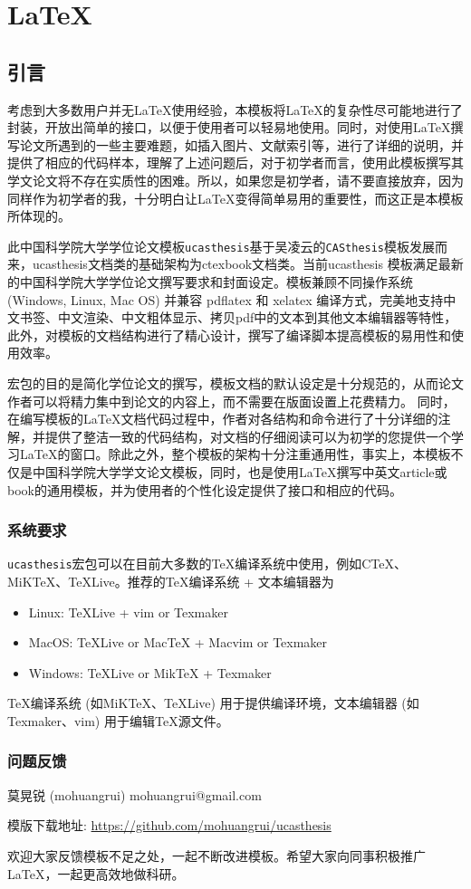 \part{\LaTeX{}} 

\chapter{引言}\label{chap:introduction}

考虑到大多数用户并无\LaTeX{}使用经验，本模板将\LaTeX{}的复杂性尽可能地进行了封装，开放出简单的接口，以便于使用者可以轻易地使用。同时，对使用\LaTeX{}撰写论文所遇到的一些主要难题，如插入图片、文献索引等，进行了详细的说明，并提供了相应的代码样本，理解了上述问题后，对于初学者而言，使用此模板撰写其学文论文将不存在实质性的困难。所以，如果您是初学者，请不要直接放弃，因为同样作为初学者的我，十分明白让\LaTeX{}变得简单易用的重要性，而这正是本模板所体现的。

此中国科学院大学学位论文模板\texttt{ucasthesis}基于吴凌云的\texttt{CASthesis}模板发展而来，ucasthesis文档类的基础架构为ctexbook文档类。当前ucasthesis 模板满足最新的中国科学院大学学位论文撰写要求和封面设定。模板兼顾不同操作系统 (Windows, Linux, Mac OS) 并兼容 pdflatex 和 xelatex 编译方式，完美地支持中文书签、中文渲染、中文粗体显示、拷贝pdf中的文本到其他文本编辑器等特性，此外，对模板的文档结构进行了精心设计，撰写了编译脚本提高模板的易用性和使用效率。

宏包的目的是简化学位论文的撰写，模板文档的默认设定是十分规范的，从而论文作者可以将精力集中到论文的内容上，而不需要在版面设置上花费精力。 同时，在编写模板的\LaTeX{}文档代码过程中，作者对各结构和命令进行了十分详细的注解，并提供了整洁一致的代码结构，对文档的仔细阅读可以为初学的您提供一个学习\LaTeX{}的窗口。除此之外，整个模板的架构十分注重通用性，事实上，本模板不仅是中国科学院大学学文论文模板，同时，也是使用\LaTeX{}撰写中英文article或book的通用模板，并为使用者的个性化设定提供了接口和相应的代码。

\section{系统要求}

\texttt{ucasthesis}宏包可以在目前大多数的\TeX{}编译系统中使用，例如C\TeX{}、MiK\TeX{}、\TeX{}Live。推荐的\TeX{}编译系统 + 文本编辑器为
\begin{itemize}
    \item Linux: \TeX{}Live + vim or Texmaker
    \item MacOS: \TeX{}Live or Mac\TeX{} + Macvim or Texmaker
    \item Windows: \TeX{}Live or Mik\TeX{}  + Texmaker
\end{itemize}
\TeX{}编译系统 (如MiK\TeX{}、\TeX{}Live) 用于提供编译环境，文本编辑器 (如Texmaker、vim) 用于编辑\TeX{}源文件。

\section{问题反馈}

\begin{center}
莫晃锐 (mohuangrui) \quad mohuangrui@gmail.com

模版下载地址: \url{https://github.com/mohuangrui/ucasthesis}
\end{center}

欢迎大家反馈模板不足之处，一起不断改进模板。希望大家向同事积极推广\LaTeX{}，一起更高效地做科研。
